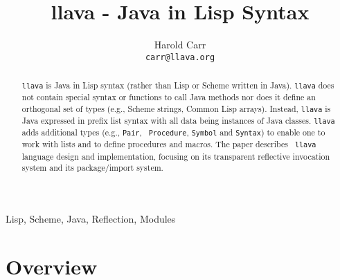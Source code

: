 \documentclass[final]{ieee}
\begin{document}
\pagestyle{empty}



\title[llava - Java in Lisp Syntax]{llava - Java in Lisp Syntax}

\author[CARR]{Harold Carr \\
       {\tt carr@llava.org}}

\maketitle

\begin{abstract}

{\tt llava} is Java in Lisp syntax (rather than Lisp or Scheme written
in Java).  {\tt llava} does not contain special syntax or functions to
call Java methods nor does it define an orthogonal set of types (e.g.,
Scheme strings, Common Lisp arrays).  Instead, {\tt llava} is Java
expressed in prefix list syntax with all data being instances of Java
classes.  {\tt llava} adds additional types (e.g., {\tt Pair}, {\tt
Procedure}, {\tt Symbol} and {\tt Syntax}) to enable one to work with
lists and to define procedures and macros.  The paper describes {\tt
llava} language design and implementation, focusing on its transparent
reflective invocation system and its package/import system.

\end{abstract}




\begin{keywords}
Lisp, Scheme, Java, Reflection, Modules
\end{keywords}

\thispagestyle{empty}

\section{Overview}
\end{document}
